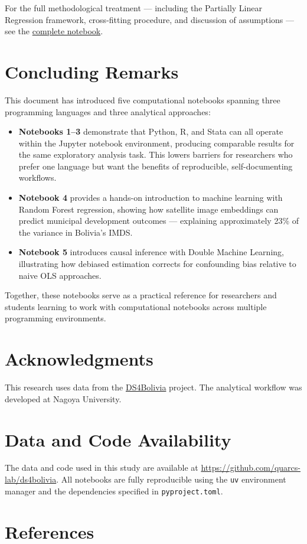 \documentclass[
  letterpaper,
  DIV=11,
  numbers=noendperiod]{scrartcl}
\providecommand{\tightlist}{%
  \setlength{\itemsep}{0pt}\setlength{\parskip}{0pt}}
\begin{document}
For the full methodological treatment --- including the Partially Linear
Regression framework, cross-fitting procedure, and discussion of
assumptions --- see the \href{notebooks/notebook-05.ipynb}{complete
notebook}.

\section{Concluding Remarks}\label{sec-conclusion}

This document has introduced five computational notebooks spanning three
programming languages and three analytical approaches:

\begin{itemize}
\tightlist
\item
  \textbf{Notebooks 1--3} demonstrate that Python, R, and Stata can all
  operate within the Jupyter notebook environment, producing comparable
  results for the same exploratory analysis task. This lowers barriers
  for researchers who prefer one language but want the benefits of
  reproducible, self-documenting workflows.
\item
  \textbf{Notebook 4} provides a hands-on introduction to machine
  learning with Random Forest regression, showing how satellite image
  embeddings can predict municipal development outcomes --- explaining
  approximately 23\% of the variance in Bolivia's IMDS.
\item
  \textbf{Notebook 5} introduces causal inference with Double Machine
  Learning, illustrating how debiased estimation corrects for
  confounding bias relative to naive OLS approaches.
\end{itemize}

Together, these notebooks serve as a practical reference for researchers
and students learning to work with computational notebooks across
multiple programming environments.

\section{Acknowledgments}\label{acknowledgments}

This research uses data from the
\href{https://github.com/quarcs-lab/ds4bolivia}{DS4Bolivia} project. The
analytical workflow was developed at Nagoya University.

\section{Data and Code Availability}\label{data-and-code-availability}

The data and code used in this study are available at
\url{https://github.com/quarcs-lab/ds4bolivia}. All notebooks are fully
reproducible using the \texttt{uv} environment manager and the
dependencies specified in \texttt{pyproject.toml}.

\section*{References}\label{references}
\end{document}

